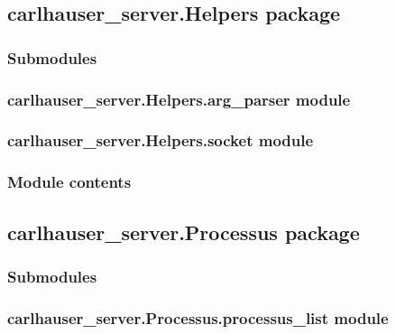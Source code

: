 \documentclass[letterpaper,10pt,english]{sphinxmanual}
\begin{document}
\subsection{carlhauser\_server.Helpers package}
\label{\detokenize{carlhauser_server.Helpers:carlhauser-server-helpers-package}}\label{\detokenize{carlhauser_server.Helpers::doc}}

\subsubsection{Submodules}
\label{\detokenize{carlhauser_server.Helpers:submodules}}

\subsubsection{carlhauser\_server.Helpers.arg\_parser module}
\label{\detokenize{carlhauser_server.Helpers:carlhauser-server-helpers-arg-parser-module}}

\subsubsection{carlhauser\_server.Helpers.socket module}
\label{\detokenize{carlhauser_server.Helpers:carlhauser-server-helpers-socket-module}}

\subsubsection{Module contents}
\label{\detokenize{carlhauser_server.Helpers:module-contents}}

\subsection{carlhauser\_server.Processus package}
\label{\detokenize{carlhauser_server.Processus:carlhauser-server-processus-package}}\label{\detokenize{carlhauser_server.Processus::doc}}

\subsubsection{Submodules}
\label{\detokenize{carlhauser_server.Processus:submodules}}

\subsubsection{carlhauser\_server.Processus.processus\_list module}
\label{\detokenize{carlhauser_server.Processus:module-carlhauser_server.Processus.processus_list}}\label{\detokenize{carlhauser_server.Processus:carlhauser-server-processus-processus-list-module}}
\end{document}
